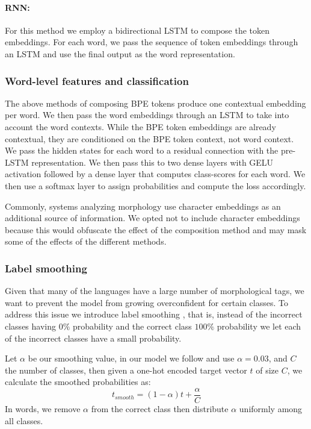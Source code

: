 \documentclass[11pt]{article}
\newcommand\citep{\cite}
\begin{document}
	
     \paragraph{RNN:} For this method we employ a bidirectional
     LSTM to compose the token embeddings. For each word, we
     pass the sequence of token embeddings through an LSTM and use the
     final output as the word representation.

     \subsubsection{Word-level features and classification}

    The above methods of composing BPE tokens produce one contextual
     embedding per word.  We then pass the word embeddings through an LSTM
     to take into account the word contexts.  While the BPE token
     embeddings are already contextual, they are conditioned on the BPE
     token context, not word context.  We pass the hidden states for
     each word to a residual connection with the pre-LSTM
     representation. We then pass this to two dense layers with GELU
     activation followed by a dense layer that computes class-scores
     for each word. We then use a softmax layer to assign
     probabilities and compute the loss accordingly.

        Commonly, systems analyzing morphology use character
     embeddings as an additional source of information. We opted not
     to include character embeddings because this would obfuscate the
     effect of the composition method and may mask some of the effects
     of the different methods.
    
	\subsubsection{Label smoothing}
    	Given that many of the languages have a large number of
     morphological tags, we want to prevent the model from growing
     overconfident for certain classes. To address this issue we
     introduce label smoothing \cite{szegedy2016rethinking}, that is,
     instead of the incorrect classes having $0\%$ probability and the
     correct class $100\%$ probability we let each of the incorrect
     classes have a small probability.

         Let $\alpha$ be our smoothing value, in our model we follow
     \citep{kondratyukstraka} and use $\alpha = 0.03$, and $C$ the
     number of classes, then given a one-hot encoded target vector $t$
     of size $C$, we calculate the smoothed probabilities as:
    \begin{equation}
        t_{smooth} = (1-\alpha)t + \frac{\alpha}{C}
    \end{equation}
    In words, we remove $\alpha$ from the correct class then
    distribute $\alpha$ uniformly among all classes.
\end{document}
